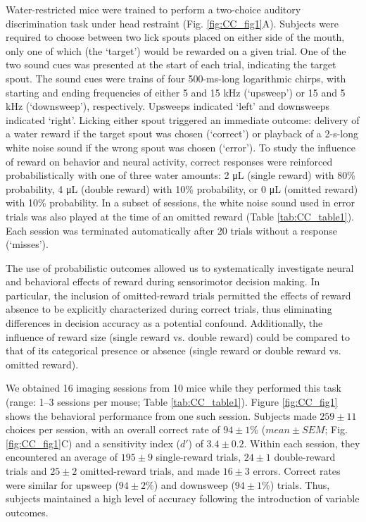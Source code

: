 
Water-restricted mice were trained to perform a two-choice auditory discrimination task under head restraint (Fig. \ref{fig:CC_fig1}A). Subjects were required to choose between two lick spouts placed on either side of the mouth, only one of which (the ‘target’) would be rewarded on a given trial. One of the two sound cues was presented at the start of each trial, indicating the target spout. The sound cues were trains of four 500-ms-long logarithmic chirps, with starting and ending frequencies of either 5 and 15 kHz (‘upsweep’) or 15 and 5 kHz (‘downsweep’), respectively. Upsweeps indicated ‘left’ and downsweeps indicated ‘right’. Licking either spout triggered an immediate outcome: delivery of a water reward if the target spout was chosen (‘correct’) or playback of a 2-s-long white noise sound if the wrong spout was chosen (‘error’). To study the influence of reward on behavior and neural activity, correct responses were reinforced probabilistically with one of three water amounts: 2 \si{\uL} (single reward) with 80\% probability, 4 \si{\uL} (double reward) with 10\% probability, or 0 \si{\uL} (omitted reward) with 10\% probability. In a subset of sessions, the white noise sound used in error trials was also played at the time of an omitted reward (Table \ref{tab:CC_table1}). Each session was terminated automatically after 20 trials without a response (‘misses’).



The use of probabilistic outcomes allowed us to systematically investigate neural and behavioral effects of reward during sensorimotor decision making. In particular, the inclusion of omitted-reward trials permitted the effects of reward absence to be explicitly characterized during correct trials, thus eliminating differences in decision accuracy as a potential confound. Additionally, the influence of reward size (single reward vs. double reward) could be compared to that of its categorical presence or absence (single reward or double reward vs. omitted reward).

We obtained 16 imaging sessions from 10 mice while they performed this task (range: 1--3 sessions per mouse; Table \ref{tab:CC_table1}). Figure \ref{fig:CC_fig1} shows the behavioral performance from one such session. Subjects made $259 \pm 11$ choices per session, with an overall correct rate of $94 \pm 1\%$ ($\mathit{mean}\pm\mathit{SEM}$; Fig. \ref{fig:CC_fig1}C) and a sensitivity index ($d'$) of $3.4 \pm 0.2$. Within each session, they encountered an average of $195 \pm 9$ single-reward trials, $24 \pm 1$ double-reward trials and $25 \pm 2$ omitted-reward trials, and made $16 \pm 3$ errors. Correct rates were similar for upsweep ($94 \pm 2\%$) and downsweep ($94 \pm 1\%$) trials. Thus, subjects maintained a high level of accuracy following the introduction of variable outcomes.

